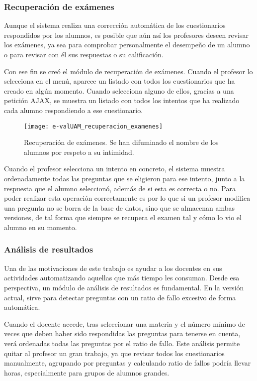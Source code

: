 \subsubsection{Recuperación de exámenes}

Aunque el sistema realiza una corrección automática de los cuestionarios respondidos por los alumnos, es posible que aún así los profesores deseen revisar los exámenes, ya sea para comprobar personalmente el desempeño de un alumno o para revisar con él sus respuestas o su calificación.

Con ese fin se creó el módulo de recuperación de exámenes. Cuando el profesor lo selecciona en el menú, aparece un listado con todos los cuestionarios que ha creado en algún momento. Cuando selecciona alguno de ellos, gracias a una petición AJAX, se muestra un listado con todos los intentos que ha realizado cada alumno respondiendo a ese cuestionario.

\begin{figure}[htp!]
	\centering
	\texttt{[image: e-valUAM\_recuperacion\_examenes]}
	\caption[Recuperación de exámenes]{Recuperación de exámenes. Se han difuminado el nombre de los alumnos por respeto a su intimidad.}
	\label{fig:e-valUAM recuperacion examenes profesor}
\end{figure}

Cuando el profesor selecciona un intento en concreto, el sistema muestra ordenadamente todas las preguntas que se eligieron para ese intento, junto a la respuesta que el alumno seleccionó, además de si esta es correcta o no. Para poder realizar esta operación correctamente es por lo que si un profesor modifica una pregunta no se borra de la base de datos, sino que se almacenan ambas versiones, de tal forma que siempre se recupera el examen tal y cómo lo vio el alumno en su momento.

\subsubsection{Análisis de resultados}

Una de las motivaciones de este trabajo es ayudar a los docentes en sus actividades automatizando aquellas que más tiempo les consuman. Desde esa perspectiva, un módulo de análisis de resultados es fundamental. En la versión actual, sirve para detectar preguntas con un ratio de fallo excesivo de forma automática. 

Cuando el docente accede, tras seleccionar una materia y el número mínimo de veces que deben haber sido respondidas las preguntas para tenerse en cuenta, verá ordenadas todas las preguntas por el ratio de fallo. Este análisis permite quitar al profesor un gran trabajo, ya que revisar todos los cuestionarios manualmente, agrupando por preguntas y calculando ratio de fallos podría llevar horas, especialmente para grupos de alumnos grandes.

